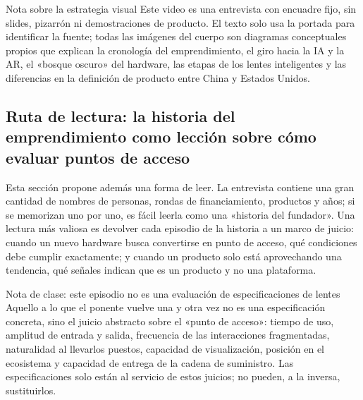 \documentclass[a4paper]{article}
\begin{document}
\begin{knowledgebox}{Nota sobre la estrategia visual}
Este video es una entrevista con encuadre fijo, sin slides, pizarrón ni demostraciones de producto. El texto solo usa la portada para identificar la fuente; todas las imágenes del cuerpo son diagramas conceptuales propios que explican la cronología del emprendimiento, el giro hacia la IA y la AR, el «bosque oscuro» del hardware, las etapas de los lentes inteligentes y las diferencias en la definición de producto entre China y Estados Unidos.
\end{knowledgebox}

\subsection{Ruta de lectura: la historia del emprendimiento como lección sobre cómo evaluar puntos de acceso}

Esta sección propone además una forma de leer. La entrevista contiene una gran cantidad de nombres de personas, rondas de financiamiento, productos y años; si se memorizan uno por uno, es fácil leerla como una «historia del fundador». Una lectura más valiosa es devolver cada episodio de la historia a un marco de juicio: cuando un nuevo hardware busca convertirse en punto de acceso, qué condiciones debe cumplir exactamente; y cuando un producto solo está aprovechando una tendencia, qué señales indican que es un producto y no una plataforma.

\begin{knowledgebox}{Nota de clase: este episodio no es una evaluación de especificaciones de lentes}
Aquello a lo que el ponente vuelve una y otra vez no es una especificación concreta, sino el juicio abstracto sobre el «punto de acceso»: tiempo de uso, amplitud de entrada y salida, frecuencia de las interacciones fragmentadas, naturalidad al llevarlos puestos, capacidad de visualización, posición en el ecosistema y capacidad de entrega de la cadena de suministro. Las especificaciones solo están al servicio de estos juicios; no pueden, a la inversa, sustituirlos.
\end{knowledgebox}
\end{document}
